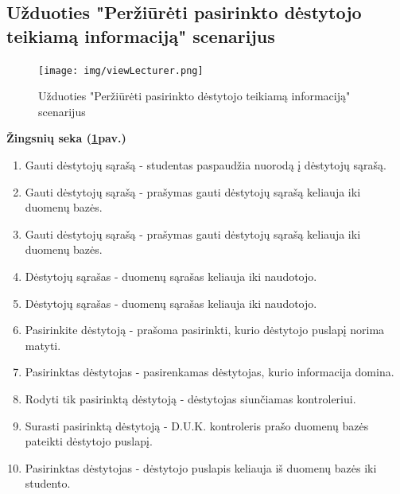 \documentclass{VUMIFPSkursinis}
\begin{document}
\subsection{Užduoties "Peržiūrėti pasirinkto dėstytojo teikiamą informaciją" scenarijus}
\begin{figure}[H]
	\centering
	\texttt{[image: img/viewLecturer.png]}
	\caption{Užduoties "Peržiūrėti pasirinkto dėstytojo teikiamą informaciją" scenarijus}
	\label{fig:viewLec}
\end{figure}
\textbf{Žingsnių seka (\ref{fig:viewLec}pav.)}\\
\begin{enumerate}
	\item Gauti dėstytojų sąrašą - studentas paspaudžia nuorodą į dėstytojų sąrašą.
	\item Gauti dėstytojų sąrašą - prašymas gauti dėstytojų sąrašą keliauja iki duomenų bazės.
	\item Gauti dėstytojų sąrašą - prašymas gauti dėstytojų sąrašą keliauja iki duomenų bazės.
	\item Dėstytojų sąrašas - duomenų sąrašas keliauja iki naudotojo.
	\item Dėstytojų sąrašas -  duomenų sąrašas keliauja iki naudotojo.
	\item Pasirinkite dėstytoją - prašoma pasirinkti, kurio dėstytojo puslapį norima matyti.
	\item Pasirinktas dėstytojas - pasirenkamas dėstytojas, kurio informacija domina.
	\item Rodyti tik pasirinktą dėstytoją - dėstytojas siunčiamas kontroleriui.
	\item Surasti pasirinktą dėstytoją -  D.U.K. kontroleris prašo duomenų bazės pateikti dėstytojo puslapį.
	\item Pasirinktas dėstytojas - dėstytojo puslapis keliauja iš duomenų bazės iki studento.
\end{enumerate}
\end{document}
